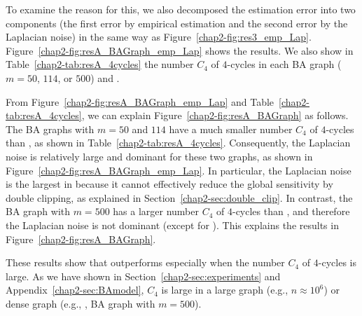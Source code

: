 {To examine the reason for this, we also decomposed the estimation error into two components (the first error by empirical estimation and the second error by the Laplacian noise) in the same way as Figure~\ref{chap2-fig:res3_emp_Lap}.
Figure~\ref{chap2-fig:resA_BAGraph_emp_Lap} shows the results.
We also show in Table~\ref{chap2-tab:resA_4cycles} the number $C_4$ of $4$-cycles in each BA graph ($m=50$, $114$, or $500$) and \GPlus{}.

From Figure~\ref{chap2-fig:resA_BAGraph_emp_Lap} and Table~\ref{chap2-tab:resA_4cycles}, we can explain Figure~\ref{chap2-fig:resA_BAGraph} as follows.
The BA graphs with $m=50$ and $114$ have a much smaller number $C_4$ of $4$-cycles than \GPlus{}, as shown in Table~\ref{chap2-tab:resA_4cycles}.
Consequently,
the Laplacian noise is relatively large and dominant for these two graphs, as shown in Figure~\ref{chap2-fig:resA_BAGraph_emp_Lap}.
In particular,
the Laplacian noise is the largest in \AlgThree{} because it cannot effectively reduce the global sensitivity by double clipping, as explained in Section~\ref{chap2-sec:double_clip}.
In contrast, the BA graph with $m=500$ has a larger number $C_4$ of $4$-cycles than \GPlus{}, and therefore the Laplacian noise is not dominant (except for \AlgThree{}).
This explains the results in Figure~\ref{chap2-fig:resA_BAGraph}.

These results
show that \AlgTwo{} outperforms \AlgOne{} especially when the number $C_4$ of $4$-cycles is large.
As we have shown in Section~\ref{chap2-sec:experiments} and Appendix~\ref{chap2-sec:BAmodel}, $C_4$ is large in a large graph (e.g., $n \approx 10^6$) or dense graph (e.g., \GPlus{}, BA graph with $m=500$).

}
